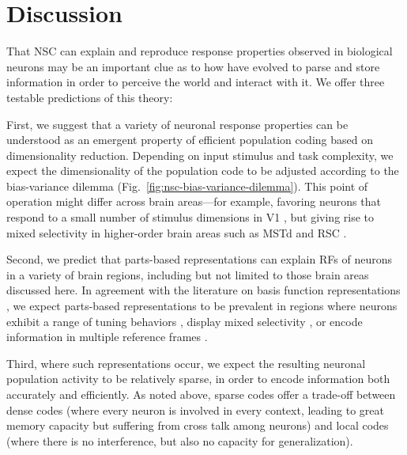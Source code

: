 \section*{Discussion}
\label{sec:discussion}

That \ac{NSC} can explain and reproduce response properties 
observed in biological neurons 
may be an important clue as to how 
have evolved to parse and store information
in order to perceive the world and interact with it.
We offer three testable predictions of this theory:

First, we suggest that a variety of neuronal response properties
can be understood as an emergent property of efficient population coding 
based on dimensionality reduction.
Depending on input stimulus and task complexity,
we expect the dimensionality of the population code to be adjusted
according to the bias-variance dilemma
(Fig.~\ref{fig:nsc-bias-variance-dilemma}).
This point of operation might differ across brain areas---for example,
favoring neurons that respond to a small number of stimulus dimensions
in \ac{V1} \cite{OlshausenField1996},
but giving rise to mixed selectivity in higher-order brain areas
such as \ac{MSTd} \cite{Beyeler2016} and
\ac{RSC} \cite{Rounds2016,Rounds2018}.

Second, we predict that parts-based representations can explain
\acp{RF} of neurons in a variety of brain regions,
including but not limited to those brain areas discussed here. 
In agreement with the literature on basis function representations
\cite{PougetSejnowski1997,PougetSnyder2000,Poggio1990},
we expect parts-based representations
to be prevalent in regions where neurons
exhibit a range of tuning behaviors \cite{Beyeler2016},
display mixed selectivity \cite{Fusi2016,Eichenbaum2017},
or encode information in multiple reference frames 
\cite{AlexanderNitz2015,Rounds2016,Rounds2018}.

Third, where such representations occur, we expect the resulting
neuronal population activity to be relatively sparse,
in order to encode information both accurately and efficiently.
As noted above, sparse codes offer a trade-off between 
dense codes (where every neuron is involved in every context,
leading to great memory capacity but suffering from cross talk among neurons)
and local codes (where there is no interference, 
but also no capacity for generalization).


